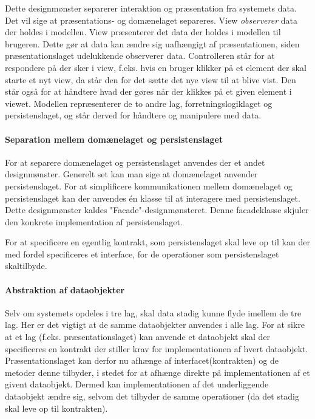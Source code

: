 Dette designmønster separerer interaktion og præsentation fra systemets data.
Det vil sige at præsentations- og domænelaget separeres. View \emph{observerer}
data der holdes i modellen. View præsenterer det data der holdes i modellen til
brugeren. Dette gør at data kan ændre sig uafhængigt af præsentationen, siden
præsentationslaget udelukkende observerer data.  Controlleren står for at
respondere på der sker i view, f.eks. hvis en bruger klikker på et element der skal
starte et nyt view, da står den for det sætte det nye view til at blive vist.
Den står også for at håndtere hvad der gøres når der klikkes på et given element
i viewet.  Modellen repræsenterer de to andre lag, forretningslogiklaget og
persistenslaget, og står derved for håndtere og manipulere med data.

\paragraph{Separation mellem domænelaget og persistenslaget}

For at separere domænelaget og persistenslaget anvendes der et andet
designmønster. Generelt set kan man sige at domænelaget anvender
persistenslaget. For at simplificere kommunikationen mellem domænelaget og
persistenslaget kan der anvendes én klasse til at interagere med persistenslaget.
Dette designmønster kaldes "Facade"-designmønsteret. Denne facadeklasse skjuler
den konkrete implementation af persistenslaget.

For at specificere en egentlig kontrakt, som persistenslaget skal leve op til
kan der med fordel specificeres et interface, for de operationer som persistenslaget skaltilbyde.

\paragraph{Abstraktion af dataobjekter}
Selv om systemets opdeles i tre lag, skal data stadig kunne flyde imellem de
tre lag. Her er det vigtigt at de samme dataobjekter anvendes i alle lag. For at
sikre at et lag (f.eks. præsentationslaget) kan anvende et dataobjekt skal der
specificeres en kontrakt der stiller krav for implementationen af hvert
dataobjekt. Præsentationslaget kan derfor nu afhænge af interfacet(kontrakten)
og de metoder denne tilbyder, i stedet for at afhænge direkte på
implementationen af et givent dataobjekt. Dermed kan implementationen af det
underliggende dataobjekt ændre sig, selvom det tilbyder de samme operationer (da
det stadig skal leve op til kontrakten).


